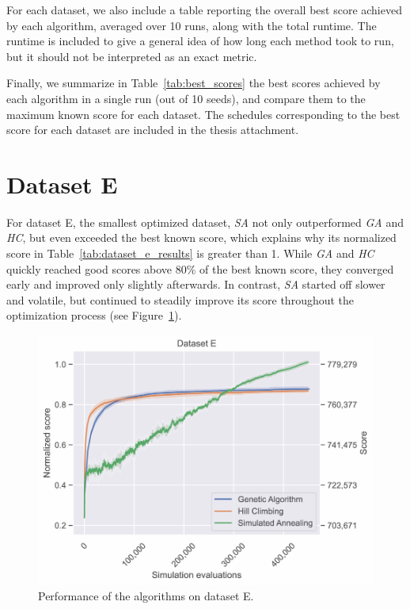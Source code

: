 For each dataset, we also include a table reporting the overall best score achieved by each algorithm, averaged over 10 runs, along with the total runtime. The runtime is included to give a general idea of how long each method took to run, but it should not be interpreted as an exact metric.

Finally, we summarize in Table~\ref{tab:best_scores} the best scores achieved by each algorithm in a single run (out of 10 seeds), and compare them to the maximum known score for each dataset. The schedules corresponding to the best score for each dataset are included in the thesis attachment.

\newpage
\section{Dataset E} \label{sec:dataset_e}

For dataset E, the smallest optimized dataset, \textit{SA} not only outperformed \textit{GA} and \textit{HC}, but even exceeded the best known score, which explains why its normalized score in Table~\ref{tab:dataset_e_results} is greater than 1. While \textit{GA} and \textit{HC} quickly reached good scores above 80\% of the best known score, they converged early and improved only slightly afterwards. In contrast, \textit{SA} started off slower and volatile, but continued to steadily improve its score throughout the optimization process (see Figure~\ref{fig:dataset_e_experiment}).

\bigskip

\begin{figure}[h]
    \centering
    \includegraphics[width=\linewidth]{img/experiments/pdfa-e_Genetic Algorithm_Hill Climbing_Simulated Annealing.pdf}
    \caption[Performance of the algorithms on dataset E]{
        Performance of the algorithms on dataset E.
    }
    \label{fig:dataset_e_experiment}
\end{figure}

